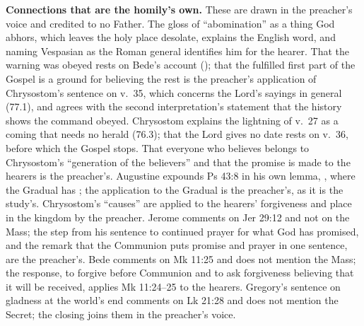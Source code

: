 {\textbf{Connections that are the homily's own.} These are drawn in the
preacher's voice and credited to no Father. The gloss of ``abomination'' as
a thing God abhors, which leaves the holy place desolate, explains the
English word, and naming Vespasian as the Roman general identifies him for
the hearer. That the warning was obeyed rests on Bede's account (); that the fulfilled first part of the
Gospel is a ground for believing the rest is the preacher's application of
Chrysostom's sentence on v.~35, which concerns the Lord's sayings in general
(77.1), and agrees with the second interpretation's statement that the history
shows the command obeyed. Chrysostom explains the lightning of v.~27 as a
coming that needs no herald (76.3); that the Lord gives no date rests on
v.~36, before which the Gospel stops. That everyone who believes belongs to
Chrysostom's ``generation of the believers'' and that the promise is made to
the hearers is the preacher's. Augustine expounds Ps 43:8 in his own lemma,
, where the Gradual has ; the application to the Gradual is
the preacher's, as it is the study's. Chrysostom's ``causes'' are applied to
the hearers' forgiveness and place in the kingdom by the preacher. Jerome
comments on Jer 29:12 and not on the Mass; the step from his sentence to
continued prayer for what God has promised, and the remark that the Communion
puts promise and prayer in one sentence, are the preacher's. Bede comments on
Mk 11:25 and does not mention the Mass; the response, to forgive before
Communion and to ask forgiveness believing that it will be received, applies
Mk 11:24--25 to the hearers. Gregory's sentence on gladness at the world's end
comments on Lk 21:28 and does not mention the Secret; the closing joins them
in the preacher's voice.

}
